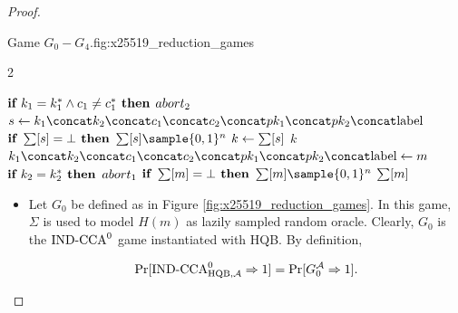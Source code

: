 \begin{proof}
\begin{gamefigure}{Game $G_0 - G_4$.}{fig:x25519_reduction_games}
\begin{games}{2}
\begin{gameenv}{\oracledec}
                            \State $\textbf{if } k_1 = k^*_1 \wedge c_1 \neq c^*_1 \textbf{ then}$
                                \State \quad $abort_2$
                                \EndBox
                                \State $s \assign \hashinput$
                                \State $\textbf{if } \sum[s] = \bot \textbf{ then}$
                                    \State \quad $\ROMtable[s] \sample \bits^{n}$
                                    \State $k \leftarrow \sum[s]$
                                    \State \Return $k$
                                    \Statex
                                    \State \underline{}
                                    \State $\hashinput \gets m$
                                    \BeginBox[draw=\gtwo]
                                    \\
                                    $\textbf{if } k_2 = k^*_2 \textbf{ then}$
                                        \State \qquad $abort_1$
                                        \EndBox
                                        \State $\textbf{if } \sum[m] = \bot \textbf{ then}$
                                            \State \quad $\ROMtable[m] \sample \bits^{n}$
                                            \State \Return $\sum[m]$
                                        \end{gameenv}
                                    \end{games}
                                    \begin{gameenv}{}

                                    \end{gameenv}
                                \end{gamefigure}

                                \begin{itemize}
                                \item[\textbf{Game 0}]
                                    Let $G_0$ be defined as in Figure \ref{fig:x25519_reduction_games}.
                                    In this game, $\Sigma$ is used to model $H(m)$ as lazily sampled random oracle.
                                    Clearly, $G_0$ is the $\text{IND-CCA}^0$ game instantiated with HQB.
                                    By definition,

                                    \[ \Pr[\text{IND-CCA}^0_{\text{HQB},\mathcal{A}} \Rightarrow 1] = \Pr[G^{\mathcal{A}}_0 \Rightarrow 1]. \]
                                \end{itemize}


\end{proof}
